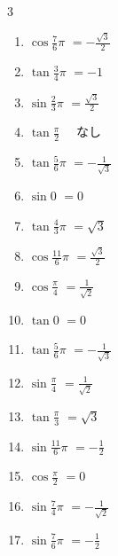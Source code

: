 \begin{multicols}{3}
\begin{enumerate}
  \item $\displaystyle \cos{\frac{7}{6}\pi}$
        $\displaystyle =-\frac{\sqrt{3}}{2}$

  \item $\displaystyle \tan{\frac{3}{4}\pi}$
        $\displaystyle =-1$

  \item $\displaystyle \sin{\frac{2}{3}\pi}$
        $\displaystyle =\frac{\sqrt{3}}{2}$

  \item $\displaystyle \tan{\frac{\pi}{2}}$
        $\displaystyle \quad なし$

  \item $\displaystyle \tan{\frac{5}{6}\pi}$
        $\displaystyle =-\frac{1}{\sqrt{3}}$

  \item $\displaystyle \sin{0}$
        $\displaystyle =0$

  \item $\displaystyle \tan{\frac{4}{3}\pi}$
        $\displaystyle =\sqrt{3}$

  \item $\displaystyle \cos{\frac{11}{6}\pi}$
        $\displaystyle =\frac{\sqrt{3}}{2}$

  \item $\displaystyle \cos{\frac{\pi}{4}}$
        $\displaystyle =\frac{1}{\sqrt{2}}$

  \item $\displaystyle \tan{0}$
        $\displaystyle =0$

  \item $\displaystyle \tan{\frac{5}{6}\pi}$
        $\displaystyle =-\frac{1}{\sqrt{3}}$

  \item $\displaystyle \sin{\frac{\pi}{4}}$
        $\displaystyle =\frac{1}{\sqrt{2}}$

  \item $\displaystyle \tan{\frac{\pi}{3}}$
        $\displaystyle =\sqrt{3}$

  \item $\displaystyle \sin{\frac{11}{6}\pi}$
        $\displaystyle =-\frac{1}{2}$

  \item $\displaystyle \cos{\frac{\pi}{2}}$
        $\displaystyle =0$

  \item $\displaystyle \sin{\frac{7}{4}\pi}$
        $\displaystyle =-\frac{1}{\sqrt{2}}$

  \item $\displaystyle \sin{\frac{7}{6}\pi}$
        $\displaystyle =-\frac{1}{2}$


\end{enumerate}
\end{multicols}
